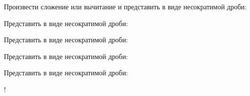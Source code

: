 \begin{class}[number=3]
	\begin{listofex}
	\item Произвести сложение или вычитание и представить в виде несократимой дроби:
	\begin{itasks}[2]
		\task {}
		\task {}
		\task {}
		\task {}
		\task {}
	\end{itasks}
	\item Представить в виде несократимой дроби:
	\begin{itasks}[2]
		\task {}
		\task {}
		\task {}
		\task {}
		\task {}
		\task {}
		\task {}
		\task {}
	\end{itasks}
	\item Представить в виде несократимой дроби:
	\begin{itasks}[2]
		\task {}
		\task {}
		\task {}
		\task {}
		\task {}
	\end{itasks}
	\item Представить в виде несократимой дроби:
	\begin{itasks}[2]
		\task {}
		\task {}
		\task {}
		\task {}
	\end{itasks}
	\item Представить в виде несократимой дроби:
	\begin{itasks}[2]
		\task {}
		\task {}
		\task {}
		\task {}
		\task {}
		\task {}
		\task! 
		\task {}
		\task {}
	\end{itasks}
	\end{listofex}
\end{class}

